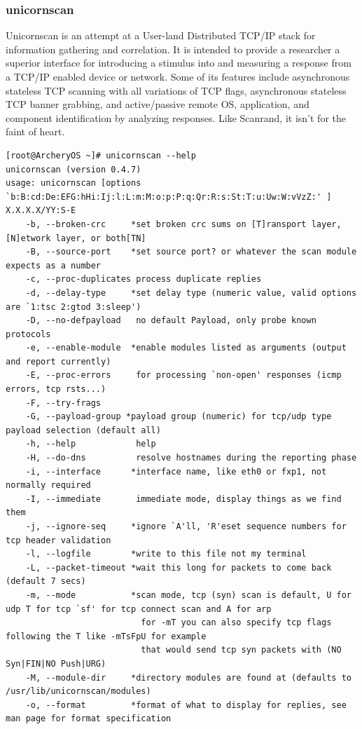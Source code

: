 \documentclass{article}
\begin{document}
\subsubsection{unicornscan}
Unicornscan is an attempt at a User-land Distributed TCP/IP stack for information gathering and correlation. It is intended to provide a researcher a superior interface for introducing a stimulus into and measuring a response from a TCP/IP enabled device or network. Some of its features include asynchronous stateless TCP scanning with all variations of TCP flags, asynchronous stateless TCP banner grabbing, and active/passive remote OS, application, and component identification by analyzing responses. Like Scanrand, it isn't for the faint of heart. 
\begin{lstlisting}
[root@ArcheryOS ~]# unicornscan --help
unicornscan (version 0.4.7)
usage: unicornscan [options `b:B:cd:De:EFG:hHi:Ij:l:L:m:M:o:p:P:q:Qr:R:s:St:T:u:Uw:W:vVzZ:' ] X.X.X.X/YY:S-E
	-b, --broken-crc     *set broken crc sums on [T]ransport layer, [N]etwork layer, or both[TN]
	-B, --source-port    *set source port? or whatever the scan module expects as a number
	-c, --proc-duplicates process duplicate replies
	-d, --delay-type     *set delay type (numeric value, valid options are `1:tsc 2:gtod 3:sleep')
	-D, --no-defpayload   no default Payload, only probe known protocols
	-e, --enable-module  *enable modules listed as arguments (output and report currently)
	-E, --proc-errors     for processing `non-open' responses (icmp errors, tcp rsts...)
	-F, --try-frags       
	-G, --payload-group	*payload group (numeric) for tcp/udp type payload selection (default all)
	-h, --help            help
	-H, --do-dns          resolve hostnames during the reporting phase
	-i, --interface      *interface name, like eth0 or fxp1, not normally required
	-I, --immediate       immediate mode, display things as we find them
	-j, --ignore-seq     *ignore `A'll, 'R'eset sequence numbers for tcp header validation
	-l, --logfile        *write to this file not my terminal
	-L, --packet-timeout *wait this long for packets to come back (default 7 secs)
	-m, --mode           *scan mode, tcp (syn) scan is default, U for udp T for tcp `sf' for tcp connect scan and A for arp
	                       for -mT you can also specify tcp flags following the T like -mTsFpU for example
	                       that would send tcp syn packets with (NO Syn|FIN|NO Push|URG)
	-M, --module-dir     *directory modules are found at (defaults to /usr/lib/unicornscan/modules)
	-o, --format         *format of what to display for replies, see man page for format specification

\end{lstlisting}
\end{document}
